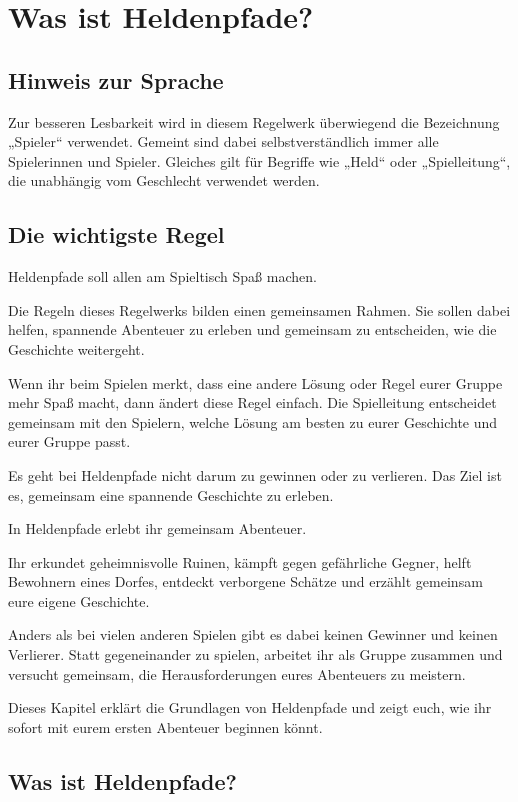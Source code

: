\chapter{Was ist Heldenpfade?}

\section*{Hinweis zur Sprache}

Zur besseren Lesbarkeit wird in diesem Regelwerk überwiegend die Bezeichnung „Spieler“ verwendet. Gemeint sind dabei selbstverständlich immer alle Spielerinnen und Spieler. Gleiches gilt für Begriffe wie „Held“ oder „Spielleitung“, die unabhängig vom Geschlecht verwendet werden.

\section*{Die wichtigste Regel}

Heldenpfade soll allen am Spieltisch Spaß machen.

Die Regeln dieses Regelwerks bilden einen gemeinsamen Rahmen. Sie sollen dabei helfen, spannende Abenteuer zu erleben und gemeinsam zu entscheiden, wie die Geschichte weitergeht.

Wenn ihr beim Spielen merkt, dass eine andere Lösung oder Regel eurer Gruppe mehr Spaß macht, dann ändert diese Regel einfach. Die Spielleitung entscheidet gemeinsam mit den Spielern, welche Lösung am besten zu eurer Geschichte und eurer Gruppe passt.

Es geht bei Heldenpfade nicht darum zu gewinnen oder zu verlieren. Das Ziel ist es, gemeinsam eine spannende Geschichte zu erleben.

In Heldenpfade erlebt ihr gemeinsam Abenteuer.

Ihr erkundet geheimnisvolle Ruinen, kämpft gegen gefährliche Gegner, helft Bewohnern eines Dorfes, entdeckt verborgene Schätze und erzählt gemeinsam eure eigene Geschichte.

Anders als bei vielen anderen Spielen gibt es dabei keinen Gewinner und keinen Verlierer. Statt gegeneinander zu spielen, arbeitet ihr als Gruppe zusammen und versucht gemeinsam, die Herausforderungen eures Abenteuers zu meistern.

Dieses Kapitel erklärt die Grundlagen von Heldenpfade und zeigt euch, wie ihr sofort mit eurem ersten Abenteuer beginnen könnt.

\section{Was ist Heldenpfade?}

